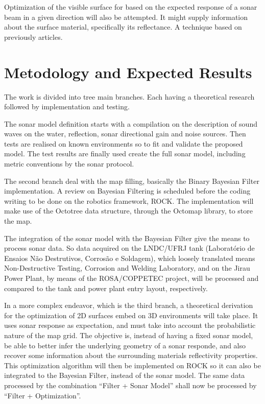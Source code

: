 \documentclass{article}
\begin{document}
Optimization of the visible surface for based on the expected response of a
sonar beam in a given direction will also be attempted. It might supply
information about the surface material, specifically its reflectance. A
technique based on previously articles.


\section{Metodology and Expected Results}

The work is divided into tree main branches. Each having a theoretical research
followed by implementation and testing.

The sonar model definition starts with a compilation on the description of sound
waves on the water, reflection, sonar directional gain and noise sources. Then
tests are realised on known environments so to fit and validate the proposed
model. The test results are finally used create the full sonar model, including
metric conventions by the sonar protocol.

The second branch deal with the map filling, basically the Binary Bayesian
Filter implementation. A review on Bayesian Filtering is scheduled before the
coding writing to be done on the robotics framework, ROCK. The implementation
will make use of the Octotree data structure, through the Octomap library, to
store the map.

The integration of the sonar model with the Bayesian Filter give the means to
process sonar data. So data acquired on the LNDC/UFRJ tank (Laboratório de
Ensaios Não Destrutivos, Corrosão e Soldagem), which loosely translated means
 Non-Destructive Testing, Corrosion and Welding Laboratory, and on the Jirau
 Power Plant, by means of the ROSA/COPPETEC project, will be processed and
 compared to the tank and power plant entry layout, respectively. 
 
 In a more complex endeavor, which is the third branch, a theoretical derivation
 for the optimization of 2D surfaces embed on 3D environments will take place.
 It uses sonar response as expectation, and must take into account the
 probabilistic nature of the map grid. The objective is, instead of having a
 fixed sonar model, be able to better infer the underlying geometry of a sonar
 responde, and also recover some information about the surrounding materials
 reflectivity properties. This optimization algorithm will then be implemented
 on ROCK so it can also be integrated to the Bayesian Filter, instead of the
 sonar model. The same data processed by the combination ``Filter + Sonar
 Model'' shall now be processed by ``Filter + Optimization''.
 
\end{document}

